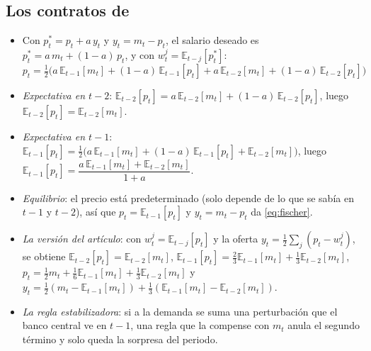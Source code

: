 \documentclass[11pt]{article}
\begin{document}
\subsection*{Los contratos de }
\begin{itemize}
\item Con $p^*_t=p_t+a\,y_t$ y $y_t=m_t-p_t$, el salario deseado es $p^*_t=a\,m_t+(1-a)\,p_t$, y con $w^j_t=\mathbb{E}_{t-j}[p^*_t]$:
  \[p_t=\tfrac12\Big(a\,\mathbb{E}_{t-1}[m_t]+(1-a)\,\mathbb{E}_{t-1}[p_t]+a\,\mathbb{E}_{t-2}[m_t]+(1-a)\,\mathbb{E}_{t-2}[p_t]\Big)\]
\item \emph{Expectativa en $t-2$}: $\mathbb{E}_{t-2}[p_t]=a\,\mathbb{E}_{t-2}[m_t]+(1-a)\,\mathbb{E}_{t-2}[p_t]$, luego $\mathbb{E}_{t-2}[p_t]=\mathbb{E}_{t-2}[m_t]$.
\item \emph{Expectativa en $t-1$}: $\mathbb{E}_{t-1}[p_t]=\tfrac12\big(a\,\mathbb{E}_{t-1}[m_t]+(1-a)\,\mathbb{E}_{t-1}[p_t]+\mathbb{E}_{t-2}[m_t]\big)$, luego $\mathbb{E}_{t-1}[p_t]=\dfrac{a\,\mathbb{E}_{t-1}[m_t]+\mathbb{E}_{t-2}[m_t]}{1+a}$.
\item \emph{Equilibrio}: el precio está predeterminado (solo depende de lo que se sabía en $t-1$ y $t-2$), así que $p_t=\mathbb{E}_{t-1}[p_t]$ y $y_t=m_t-p_t$ da \eqref{eq:fischer}.
\item \emph{La versión del artículo}: con $w^j_t=\mathbb{E}_{t-j}[p_t]$ y la oferta $y_t=\tfrac12\sum_j(p_t-w^j_t)$, se obtiene $\mathbb{E}_{t-2}[p_t]=\mathbb{E}_{t-2}[m_t]$, $\mathbb{E}_{t-1}[p_t]=\tfrac23\mathbb{E}_{t-1}[m_t]+\tfrac13\mathbb{E}_{t-2}[m_t]$, $p_t=\tfrac12m_t+\tfrac16\mathbb{E}_{t-1}[m_t]+\tfrac13\mathbb{E}_{t-2}[m_t]$ y $y_t=\tfrac12(m_t-\mathbb{E}_{t-1}[m_t])+\tfrac13(\mathbb{E}_{t-1}[m_t]-\mathbb{E}_{t-2}[m_t])$\nocite{Fischer1977Long}.
\item \emph{La regla estabilizadora}: si a la demanda se suma una perturbación que el banco central ve en $t-1$, una regla que la compense con $m_t$ anula el segundo término y solo queda la sorpresa del periodo. \findemo
\end{itemize}
\end{document}
